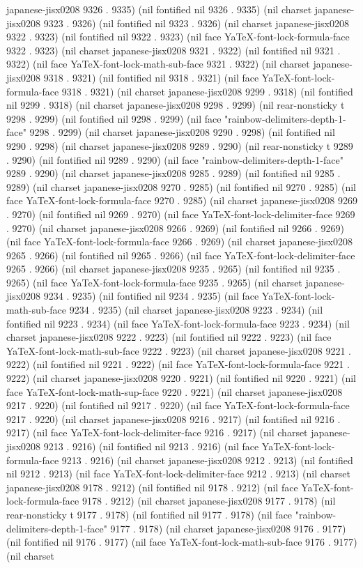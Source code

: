 japanese-jisx0208 9326 . 9335) (nil fontified nil 9326 . 9335) (nil charset japanese-jisx0208 9323 . 9326) (nil fontified nil 9323 . 9326) (nil charset japanese-jisx0208 9322 . 9323) (nil fontified nil 9322 . 9323) (nil face YaTeX-font-lock-formula-face 9322 . 9323) (nil charset japanese-jisx0208 9321 . 9322) (nil fontified nil 9321 . 9322) (nil face YaTeX-font-lock-math-sub-face 9321 . 9322) (nil charset japanese-jisx0208 9318 . 9321) (nil fontified nil 9318 . 9321) (nil face YaTeX-font-lock-formula-face 9318 . 9321) (nil charset japanese-jisx0208 9299 . 9318) (nil fontified nil 9299 . 9318) (nil charset japanese-jisx0208 9298 . 9299) (nil rear-nonsticky t 9298 . 9299) (nil fontified nil 9298 . 9299) (nil face "rainbow-delimiters-depth-1-face" 9298 . 9299) (nil charset japanese-jisx0208 9290 . 9298) (nil fontified nil 9290 . 9298) (nil charset japanese-jisx0208 9289 . 9290) (nil rear-nonsticky t 9289 . 9290) (nil fontified nil 9289 . 9290) (nil face "rainbow-delimiters-depth-1-face" 9289 . 9290) (nil charset japanese-jisx0208 9285 . 9289) (nil fontified nil 9285 . 9289) (nil charset japanese-jisx0208 9270 . 9285) (nil fontified nil 9270 . 9285) (nil face YaTeX-font-lock-formula-face 9270 . 9285) (nil charset japanese-jisx0208 9269 . 9270) (nil fontified nil 9269 . 9270) (nil face YaTeX-font-lock-delimiter-face 9269 . 9270) (nil charset japanese-jisx0208 9266 . 9269) (nil fontified nil 9266 . 9269) (nil face YaTeX-font-lock-formula-face 9266 . 9269) (nil charset japanese-jisx0208 9265 . 9266) (nil fontified nil 9265 . 9266) (nil face YaTeX-font-lock-delimiter-face 9265 . 9266) (nil charset japanese-jisx0208 9235 . 9265) (nil fontified nil 9235 . 9265) (nil face YaTeX-font-lock-formula-face 9235 . 9265) (nil charset japanese-jisx0208 9234 . 9235) (nil fontified nil 9234 . 9235) (nil face YaTeX-font-lock-math-sub-face 9234 . 9235) (nil charset japanese-jisx0208 9223 . 9234) (nil fontified nil 9223 . 9234) (nil face YaTeX-font-lock-formula-face 9223 . 9234) (nil charset japanese-jisx0208 9222 . 9223) (nil fontified nil 9222 . 9223) (nil face YaTeX-font-lock-math-sub-face 9222 . 9223) (nil charset japanese-jisx0208 9221 . 9222) (nil fontified nil 9221 . 9222) (nil face YaTeX-font-lock-formula-face 9221 . 9222) (nil charset japanese-jisx0208 9220 . 9221) (nil fontified nil 9220 . 9221) (nil face YaTeX-font-lock-math-sup-face 9220 . 9221) (nil charset japanese-jisx0208 9217 . 9220) (nil fontified nil 9217 . 9220) (nil face YaTeX-font-lock-formula-face 9217 . 9220) (nil charset japanese-jisx0208 9216 . 9217) (nil fontified nil 9216 . 9217) (nil face YaTeX-font-lock-delimiter-face 9216 . 9217) (nil charset japanese-jisx0208 9213 . 9216) (nil fontified nil 9213 . 9216) (nil face YaTeX-font-lock-formula-face 9213 . 9216) (nil charset japanese-jisx0208 9212 . 9213) (nil fontified nil 9212 . 9213) (nil face YaTeX-font-lock-delimiter-face 9212 . 9213) (nil charset japanese-jisx0208 9178 . 9212) (nil fontified nil 9178 . 9212) (nil face YaTeX-font-lock-formula-face 9178 . 9212) (nil charset japanese-jisx0208 9177 . 9178) (nil rear-nonsticky t 9177 . 9178) (nil fontified nil 9177 . 9178) (nil face "rainbow-delimiters-depth-1-face" 9177 . 9178) (nil charset japanese-jisx0208 9176 . 9177) (nil fontified nil 9176 . 9177) (nil face YaTeX-font-lock-math-sub-face 9176 . 9177) (nil charset 